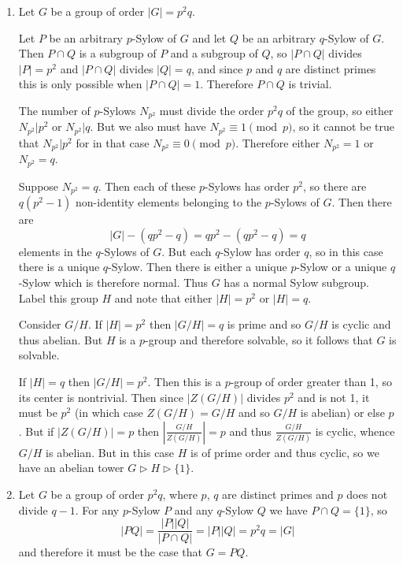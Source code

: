 \documentclass{article}
\begin{document}
\begin{Answer}
\begin{enumerate}
  \item{
    Let $G$ be a group of order $|G| = p^2 q$.

    Let $P$ be an arbitrary $p$-Sylow of $G$ and let $Q$ be an
    arbitrary $q$-Sylow of $G$. Then $P \cap Q$ is a subgroup of $P$
    and a subgroup of $Q$, so $|P \cap Q|$ divides $|P| = p^2$ and
    $|P \cap Q|$ divides $|Q| = q$, and since $p$ and $q$ are distinct
    primes this is only possible when $|P \cap Q| = 1$. Therefore $P
    \cap Q$ is trivial.

    The number of $p$-Sylows $N_{p^2}$ must divide the order $p^2q$ of the
    group, so either $N_{p^2} \vert p^2$ or $N_{p^2} \vert q$. But
    we also must have $N_{p^2} \equiv 1 \pmod{p}$, so it cannot be true
    that $N_{p^2} \vert p^2$ for in that case $N_{p^2} \equiv 0
    \pmod{p}$.
    Therefore either $N_{p^2} = 1$ or $N_{p^2} = q$.

    Suppose $N_{p^2} = q$. Then each of these $p$-Sylows has order
    $p^2$, so there are $q (p^2 - 1)$ non-identity elements belonging
    to the $p$-Sylows of $G$. Then there are
    $$
    |G| - (qp^2 - q) = qp^2 - (qp^2 - q) = q
    $$
    elements in the $q$-Sylows of $G$. But each $q$-Sylow has order
    $q$, so in this case there is a unique $q$-Sylow. Then there
    is either a unique $p$-Sylow or a unique $q$-Sylow which is
    therefore normal. Thus $G$ has a normal Sylow subgroup.
    Label this group $H$ and note that either $|H| = p^2$ or
    $|H| = q$.

    Consider $G / H$. If $|H| = p^2$ then $|G / H| = q$ is prime and
    so $G / H$ is cyclic and thus abelian. But $H$ is a $p$-group and
    therefore solvable, so it follows that $G$ is solvable.

    If $|H| = q$ then $|G / H| = p^2$. Then this is a $p$-group of
    order greater than 1, so its
    center is nontrivial. Then since $|Z(G / H)|$ divides $p^2$ and is
    not 1, it must be $p^2$ (in which case $Z(G / H) = G / H$ and so
    $G / H$ is abelian) or else $p$. But if $|Z(G / H)| = p$ then
    $\left|\frac{G / H}{Z(G / H)}\right| = p$ and thus
    $\frac{G / H}{Z(G / H)}$ is cyclic, whence $G / H$ is abelian. But
    in this case $H$ is of prime order and thus cyclic, so we have an
    abelian tower $G \triangleright H \triangleright \{ 1 \}$.
  }
  \item
  {
    Let $G$ be a group of order $p^2 q$, where $p$, $q$ are distinct
    primes and $p$ does not divide $q-1$. For any $p$-Sylow $P$
    and any $q$-Sylow $Q$ we have $P \cap Q = \{ 1 \}$, so
    $$
    |PQ| = \frac{|P||Q|}{|P \cap Q|} = |P||Q| = p^2 q = |G|
    $$
    and therefore it must be the case that $G = PQ$.

}
\end{enumerate}
\end{Answer}
\end{document}
